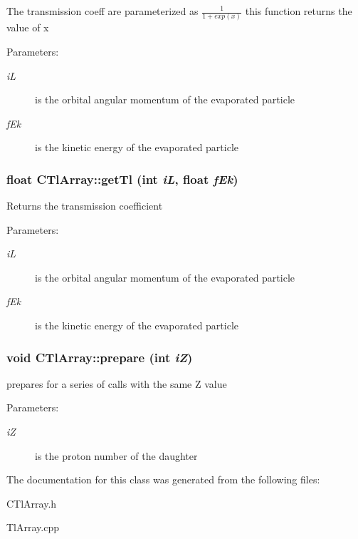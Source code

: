 The transmission coeff are parameterized as $\frac{1}{1+exp(x)}$ this function returns the value of x \begin{Desc}
\item[Parameters:]
\begin{description}
\item[{\em i\-L}]is the orbital angular momentum of the evaporated particle \item[{\em f\-Ek}]is the kinetic energy of the evaporated particle \end{description}
\end{Desc}
\subsubsection{\setlength{\rightskip}{0pt plus 5cm}float CTl\-Array::get\-Tl (int {\em i\-L}, float {\em f\-Ek})}\label{classCTlArray_a8d48df48e1c635f88157c081500f893}


Returns the transmission coefficient \begin{Desc}
\item[Parameters:]
\begin{description}
\item[{\em i\-L}]is the orbital angular momentum of the evaporated particle \item[{\em f\-Ek}]is the kinetic energy of the evaporated particle \end{description}
\end{Desc}
\subsubsection{\setlength{\rightskip}{0pt plus 5cm}void CTl\-Array::prepare (int {\em i\-Z})}\label{classCTlArray_714f982512481d8d188ea536235d84b6}


prepares for a series of calls with the same Z value \begin{Desc}
\item[Parameters:]
\begin{description}
\item[{\em i\-Z}]is the proton number of the daughter \end{description}
\end{Desc}


The documentation for this class was generated from the following files:\begin{CompactItemize}
\item 
CTl\-Array.h\item 
Tl\-Array.cpp\end{CompactItemize}
